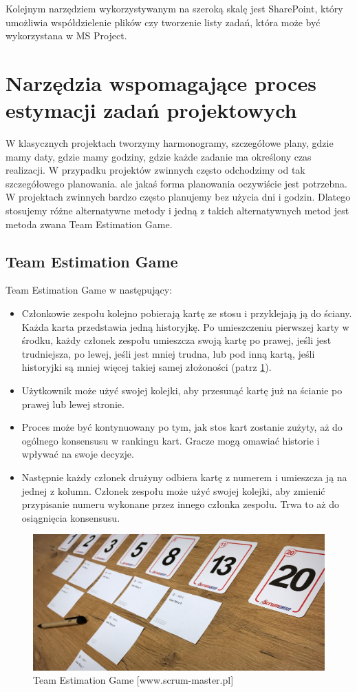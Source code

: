 Kolejnym narzędziem wykorzystywanym na szeroką skalę jest SharePoint,
który umożliwia współdzielenie plików czy tworzenie listy zadań,
która może być wykorzystana w MS Project.

\section{Narzędzia wspomagające proces estymacji zadań projektowych}

W klasycznych projektach tworzymy harmonogramy, szczegółowe plany, gdzie mamy daty,
gdzie mamy godziny, gdzie każde zadanie ma określony czas realizacji.
W przypadku projektów zwinnych często odchodzimy od tak szczegółowego planowania.
ale jakaś forma planowania oczywiście jest potrzebna.
W projektach zwinnych bardzo często planujemy bez użycia dni i godzin.
Dlatego stosujemy różne alternatywne metody i jedną z takich alternatywnych metod
jest metoda zwana Team Estimation Game.

\subsection{Team Estimation Game}

Team Estimation Game w następujący:

\begin{itemize}
	\item Członkowie zespołu kolejno pobierają kartę ze stosu i przyklejają ją do ściany.
	Każda karta przedstawia jedną historyjkę.
	Po umieszczeniu pierwszej karty w środku, każdy członek zespołu umieszcza swoją kartę po prawej,
	jeśli jest trudniejsza, po lewej, jeśli jest mniej trudna,
	lub pod inną kartą, jeśli historyjki są mniej więcej takiej samej złożoności
	(patrz \ref{rys:teamEstimationGame}).
	\item Użytkownik może użyć swojej kolejki, aby przesunąć kartę już na ścianie po prawej lub lewej stronie.
	\item Proces może być kontynuowany po tym, jak stos kart zostanie zużyty,
	aż do ogólnego konsensusu w rankingu kart. Gracze mogą omawiać historie i wpływać na swoje decyzje.
	\item Następnie każdy członek drużyny odbiera kartę z numerem i umieszcza ją na jednej z kolumn.
	Członek zespołu może użyć swojej kolejki, aby zmienić przypisanie numeru
	wykonane przez innego członka zespołu. Trwa to aż do osiągnięcia konsensusu.
\end{itemize}

\begin{figure}[H]
	\centering\includegraphics[width=.6\textwidth]{img/team_estimation_game}
	\caption{Team Estimation Game [www.scrum-master.pl]}
	\label{rys:teamEstimationGame}
\end{figure}

